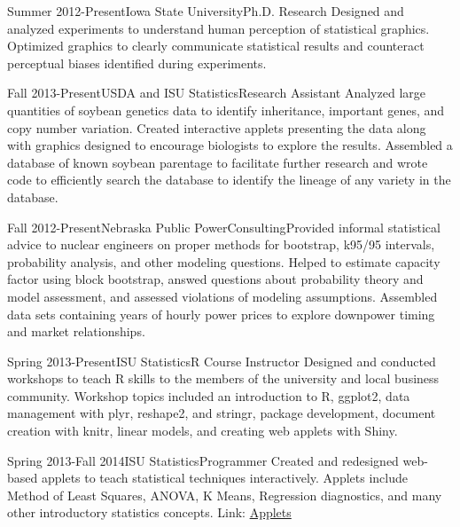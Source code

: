 \documentclass[10pt]{tccv}
\begin{document}
\begin{eventlist}
% 

\item{Summer 2012-Present}{Iowa State University}{Ph.D. Research}{
Designed and analyzed experiments to understand human perception of statistical graphics. Optimized graphics to clearly communicate statistical results and counteract perceptual biases identified during experiments.\cite{sineillusionjcgs,jsm2014,jsm2014userpanel,jsm2013}}

\item{Fall 2013-Present}{USDA and ISU Statistics}{Research Assistant}{
Analyzed large quantities of soybean genetics data to identify inheritance, important genes, and copy number variation. Created interactive applets presenting the data along with graphics designed to encourage biologists to explore the results. Assembled a database of known soybean parentage to facilitate further research and wrote code to efficiently search the database to identify the lineage of any variety in the database. }

\item{Fall 2012-Present}{Nebraska Public Power}{Consulting}{Provided informal statistical advice to nuclear engineers on proper methods for bootstrap, k95/95 intervals, probability analysis, and other modeling questions. Helped to estimate capacity factor using block bootstrap, answed questions about probability theory and model assessment, and assessed violations of modeling assumptions. Assembled data sets containing years of hourly power prices to explore downpower timing and market relationships.}

\item{Spring 2013-Present}{ISU Statistics}{R Course Instructor}{
Designed and conducted workshops to teach R skills to the members of the university and local business community. Workshop topics included an introduction to R, ggplot2, data management with plyr, reshape2, and stringr, package development, document creation with knitr, linear models, and creating web applets with Shiny. }

\item{Spring 2013-Fall 2014}{ISU Statistics}{Programmer}{
Created and redesigned web-based applets to teach statistical techniques interactively. Applets include Method of Least Squares, ANOVA, K Means, Regression diagnostics, and many other introductory statistics concepts. Link: \href{http://vanderplas.dyndns-remote.com:3838/}{Applets}}


\end{eventlist}
\end{document}
